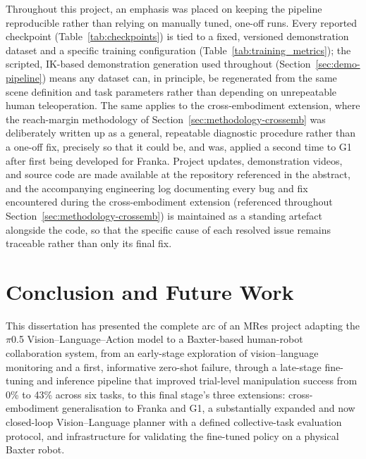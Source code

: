 \documentclass[12pt]{article}
\begin{document}
Throughout this project, an emphasis was placed on keeping the pipeline reproducible rather than relying on manually tuned, one-off runs. Every reported checkpoint (Table~\ref{tab:checkpoints}) is tied to a fixed, versioned demonstration dataset and a specific training configuration (Table~\ref{tab:training_metrics}); the scripted, IK-based demonstration generation used throughout (Section~\ref{sec:demo-pipeline}) means any dataset can, in principle, be regenerated from the same scene definition and task parameters rather than depending on unrepeatable human teleoperation. The same applies to the cross-embodiment extension, where the reach-margin methodology of Section~\ref{sec:methodology-crossemb} was deliberately written up as a general, repeatable diagnostic procedure rather than a one-off fix, precisely so that it could be, and was, applied a second time to G1 after first being developed for Franka. Project updates, demonstration videos, and source code are made available at the repository referenced in the abstract, and the accompanying engineering log documenting every bug and fix encountered during the cross-embodiment extension (referenced throughout Section~\ref{sec:methodology-crossemb}) is maintained as a standing artefact alongside the code, so that the specific cause of each resolved issue remains traceable rather than only its final fix.

\section{Conclusion and Future Work}
\label{sec:conclusion}

This dissertation has presented the complete arc of an MRes project adapting the $\pi$0.5 Vision--Language--Action model to a Baxter-based human-robot collaboration system, from an early-stage exploration of vision--language monitoring and a first, informative zero-shot failure, through a late-stage fine-tuning and inference pipeline that improved trial-level manipulation success from 0\% to 43\% across six tasks, to this final stage's three extensions: cross-embodiment generalisation to Franka and G1, a substantially expanded and now closed-loop Vision--Language planner with a defined collective-task evaluation protocol, and infrastructure for validating the fine-tuned policy on a physical Baxter robot.
\end{document}
